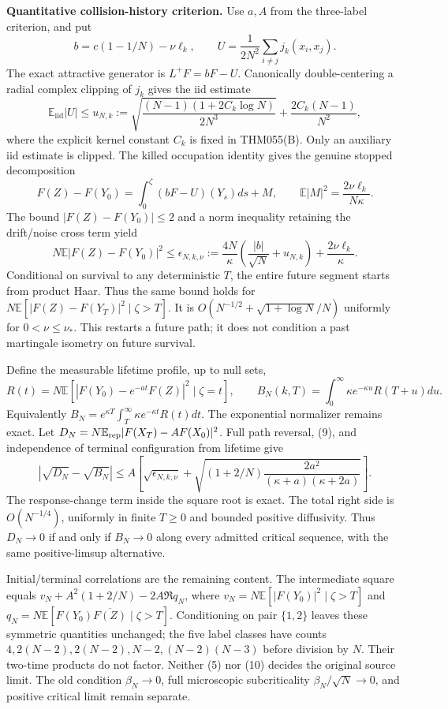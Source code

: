 \documentclass[11pt]{article}
\newcommand{\E}{\mathbb E}
\begin{document}
\newpage
\noindent\textbf{Quantitative collision-history criterion.}
Use $a,A$ from the three-label criterion, and put
\[
 b=c(1-1/N)-\nu\ell_k,\qquad
 U=\frac1{2N^2}\sum_{i\ne j}j_k(x_i,x_j).
\]
The exact attractive generator is $L^+F=bF-U$. Canonically double-centering a radial complex clipping of $j_k$ gives the iid estimate
\[
 \E_{\mathrm{iid}}|U|\le u_{N,k}:=
 \sqrt{\frac{(N-1)(1+2C_k\log N)}{2N^3}}
       +\frac{2C_k(N-1)}{N^2},
\]
where the explicit kernel constant $C_k$ is fixed in THM055(B).
Only an auxiliary iid estimate is clipped. The killed occupation identity gives the genuine stopped decomposition
\[
 F(Z)-F(Y_0)=\int_0^\zeta(bF-U)(Y_s)ds+M,
 \qquad \E|M|^2=\frac{2\nu\ell_k}{N\kappa}.
\]
The bound $|F(Z)-F(Y_0)|\le2$ and a norm inequality retaining the drift/noise cross term yield
\[
 N\E|F(Z)-F(Y_0)|^2\le\epsilon_{N,k,\nu}
 :=\frac{4N}{\kappa}\left(\frac{|b|}{\sqrt N}+u_{N,k}\right)
       +\frac{2\nu\ell_k}{\kappa}.\tag{9}
\]
Conditional on survival to any deterministic $T$, the entire future segment starts from product Haar. Thus the same bound holds for
$N\E[|F(Z)-F(Y_T)|^2\mid\zeta>T]$.
It is $O(N^{-1/2}+\sqrt{1+\log N}/N)$ uniformly for $0<\nu\le\nu_*$. This restarts a future path; it does not condition a past martingale isometry on future survival.

Define the measurable lifetime profile, up to null sets,
\[
 R(t)=N\E[|F(Y_0)-e^{-at}F(Z)|^2\mid\zeta=t],\qquad
 B_N(k,T)=\int_0^\infty\kappa e^{-\kappa u}R(T+u)du.
\]
Equivalently $B_N=e^{\kappa T}\int_T^\infty\kappa e^{-\kappa t}R(t)dt$.
The exponential normalizer remains exact. Let
$D_N=N\E_{\rm rep}|F(X_T)-AF(X_0)|^2$.
Full path reversal, (9), and independence of terminal configuration from lifetime give
\[
 |\sqrt{D_N}-\sqrt{B_N}|
 \le A\left[\sqrt{\epsilon_{N,k,\nu}}+
 \sqrt{(1+2/N)\frac{2a^2}{(\kappa+a)(\kappa+2a)}}\right].\tag{10}
\]
The response-change term inside the square root is exact. The total right side is $O(N^{-1/4})$, uniformly in finite $T\ge0$ and bounded positive diffusivity. Thus $D_N\to0$ if and only if $B_N\to0$ along every admitted critical sequence, with the same positive-limsup alternative.

Initial/terminal correlations are the remaining content. The intermediate square equals
$v_N+A^2(1+2/N)-2A\Re q_N$, where
$v_N=N\E[|F(Y_0)|^2\mid\zeta>T]$ and
$q_N=N\E[F(Y_0)\overline{F(Z)}\mid\zeta>T]$.
Conditioning on pair $\{1,2\}$ leaves these symmetric quantities unchanged; the five label classes have counts
$4,2(N-2),2(N-2),N-2,(N-2)(N-3)$ before division by $N$.
Their two-time products do not factor. Neither (5) nor (10) decides the original source limit. The old condition $\beta_N\to0$, full microscopic subcriticality $\beta_N/\sqrt N\to0$, and positive critical limit remain separate.
\end{document}
